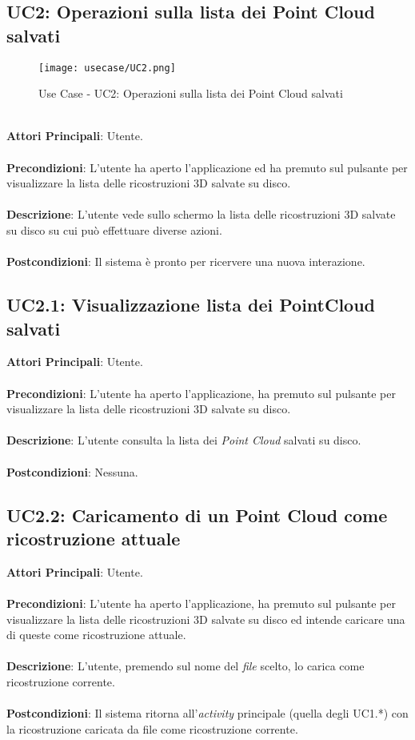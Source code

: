 \subsection{UC2: Operazioni sulla lista dei Point Cloud salvati}
\begin{figure}[!h] 
    \centering 
    \texttt{[image: usecase/UC2.png]} 
    \caption{Use Case - UC2: Operazioni sulla lista dei Point Cloud salvati}
\end{figure}
\ \\
\textbf{Attori Principali}: Utente.
\\\\ \textbf{Precondizioni}: L'utente ha aperto l'applicazione ed ha premuto sul pulsante per visualizzare la lista delle ricostruzioni 3D salvate su disco.
\\\\ \textbf{Descrizione}: L'utente vede sullo schermo la lista delle ricostruzioni 3D salvate su disco su cui può effettuare diverse azioni.
\\\\ \textbf{Postcondizioni}: Il sistema è pronto per ricervere una nuova interazione.


\subsection{UC2.1: Visualizzazione lista dei PointCloud salvati}
\textbf{Attori Principali}: Utente.
\\\\ \textbf{Precondizioni}: L'utente ha aperto l'applicazione, ha premuto sul pulsante per visualizzare la lista delle ricostruzioni 3D salvate su disco.
\\\\ \textbf{Descrizione}: L'utente consulta la lista dei \emph{Point Cloud} salvati su disco.
\\\\ \textbf{Postcondizioni}: Nessuna.

\subsection{UC2.2: Caricamento di un Point Cloud come ricostruzione attuale}
\textbf{Attori Principali}: Utente.
\\\\ \textbf{Precondizioni}: L'utente ha aperto l'applicazione, ha premuto sul pulsante per visualizzare la lista delle ricostruzioni 3D salvate su disco ed intende caricare una di queste come ricostruzione attuale.
\\\\ \textbf{Descrizione}: L'utente, premendo sul nome del \emph{file} scelto, lo carica come ricostruzione corrente.
\\\\ \textbf{Postcondizioni}: Il sistema ritorna all'\emph{activity} principale (quella degli UC1.*) con la ricostruzione caricata da file come ricostruzione corrente.

